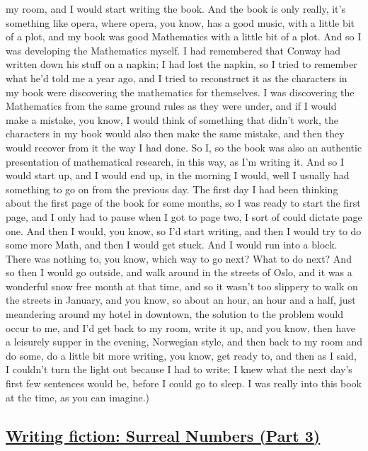 \documentclass[]{article}
\begin{document}
my room, and I would start writing the book. And the book is only
really, it's something like opera, where opera, you know, has a good
music, with a little bit of a plot, and my book was good Mathematics
with a little bit of a plot. And so I was developing the Mathematics
myself. I had remembered that Conway had written down his stuff on a
napkin; I had lost the napkin, so I tried to remember what he'd told me
a year ago, and I tried to reconstruct it as the characters in my book
were discovering the mathematics for themselves. I was discovering the
Mathematics from the same ground rules as they were under, and if I
would make a mistake, you know, I would think of something that didn't
work, the characters in my book would also then make the same mistake,
and then they would recover from it the way I had done. So I, so the
book was also an authentic presentation of mathematical research, in
this way, as I'm writing it. And so I would start up, and I would end
up, in the morning I would, well I usually had something to go on from
the previous day. The first day I had been thinking about the first page
of the book for some months, so I was ready to start the first page, and
I only had to pause when I got to page two, I sort of could dictate page
one. And then I would, you know, so I'd start writing, and then I would
try to do some more Math, and then I would get stuck. And I would run
into a block. There was nothing to, you know, which way to go next? What
to do next? And so then I would go outside, and walk around in the
streets of Oslo, and it was a wonderful snow free month at that time,
and so it wasn't too slippery to walk on the streets in January, and you
know, so about an hour, an hour and a half, just meandering around my
hotel in downtown, the solution to the problem would occur to me, and
I'd get back to my room, write it up, and you know, then have a
leisurely supper in the evening, Norwegian style, and then back to my
room and do some, do a little bit more writing, you know, get ready to,
and then as I said, I couldn't turn the light out because I had to
write; I knew what the next day's first few sentences would be, before I
could go to sleep. I was really into this book at the time, as you can
imagine.)

\subsection{\texorpdfstring{\href{http://webofstories.com/play/17101}{Writing
fiction: Surreal Numbers (Part
3)}}{Writing fiction: Surreal Numbers (Part 3)}}\label{writing-fiction-surreal-numbers-part-3}
\end{document}

